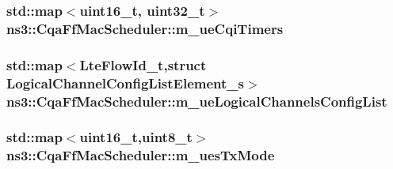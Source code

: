 \subsubsection[{\texorpdfstring{m\+\_\+ue\+Cqi\+Timers}{m_ueCqiTimers}}]{\setlength{\rightskip}{0pt plus 5cm}std\+::map$<$uint16\+\_\+t, uint32\+\_\+t$>$ ns3\+::\+Cqa\+Ff\+Mac\+Scheduler\+::m\+\_\+ue\+Cqi\+Timers\hspace{0.3cm}{\ttfamily [private]}}\hypertarget{classns3_1_1CqaFfMacScheduler_a3393d690f2b1d2a41e428b87318b15e1}{}\label{classns3_1_1CqaFfMacScheduler_a3393d690f2b1d2a41e428b87318b15e1}
\subsubsection[{\texorpdfstring{m\+\_\+ue\+Logical\+Channels\+Config\+List}{m_ueLogicalChannelsConfigList}}]{\setlength{\rightskip}{0pt plus 5cm}std\+::map$<${\bf Lte\+Flow\+Id\+\_\+t},struct {\bf Logical\+Channel\+Config\+List\+Element\+\_\+s}$>$ ns3\+::\+Cqa\+Ff\+Mac\+Scheduler\+::m\+\_\+ue\+Logical\+Channels\+Config\+List\hspace{0.3cm}{\ttfamily [private]}}\hypertarget{classns3_1_1CqaFfMacScheduler_a2e7fafcc959bf531979bc041782ac5b1}{}\label{classns3_1_1CqaFfMacScheduler_a2e7fafcc959bf531979bc041782ac5b1}
\subsubsection[{\texorpdfstring{m\+\_\+ues\+Tx\+Mode}{m_uesTxMode}}]{\setlength{\rightskip}{0pt plus 5cm}std\+::map$<$uint16\+\_\+t,uint8\+\_\+t$>$ ns3\+::\+Cqa\+Ff\+Mac\+Scheduler\+::m\+\_\+ues\+Tx\+Mode\hspace{0.3cm}{\ttfamily [private]}}\hypertarget{classns3_1_1CqaFfMacScheduler_ac556c4275bc3c2c078fd5856069ba0ca}{}\label{classns3_1_1CqaFfMacScheduler_ac556c4275bc3c2c078fd5856069ba0ca}
